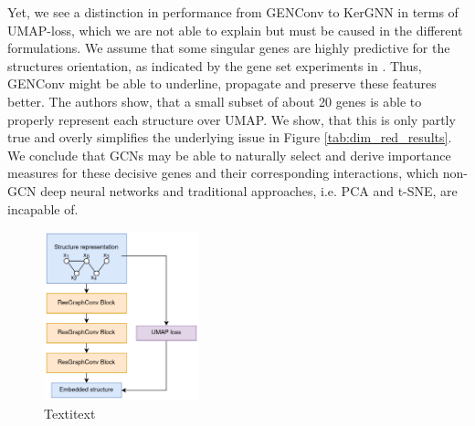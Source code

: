 \documentclass[]{article}
\begin{document}
Yet, we see a distinction in performance from GENConv to KerGNN in terms of UMAP-loss, which we are not able to explain but must be caused in the different formulations. We assume that some singular genes are highly predictive for the structures orientation, as indicated by the gene set experiments in \citet{Partel2020}. Thus, GENConv might be able to underline, propagate and preserve these features better. The authors show, that a small subset of about 20 genes is able to properly represent each structure over UMAP. We show, that this is only partly true and overly simplifies the underlying issue in Figure \ref{tab:dim_red_results}. We conclude that GCNs may be able to naturally select and derive importance measures for these decisive genes and their corresponding interactions, which non-GCN deep neural networks and traditional approaches, i.e. PCA and t-SNE, are incapable of.

\begin{figure}
	\centering
	\includegraphics[width=0.4\textwidth]{figures/Dim_red_model_GCN.png}
	\caption{Textitext}
	\label{fig:dim_red_mdel}
\end{figure}
\end{document}
